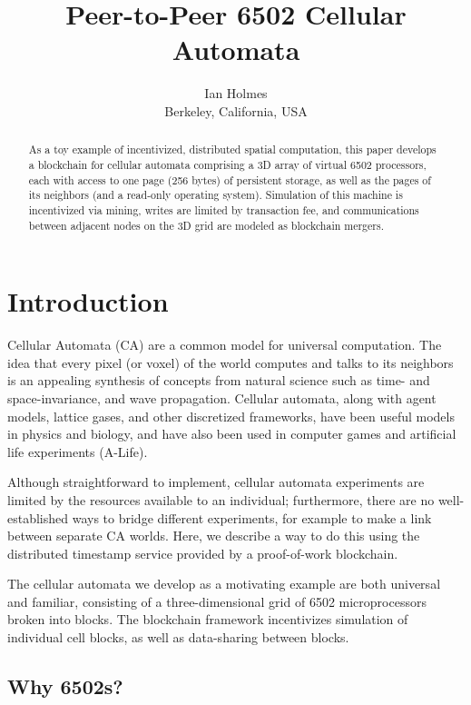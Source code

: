 \documentclass{article}
\begin{document}
\title{Peer-to-Peer 6502 Cellular Automata}
\author{Ian Holmes \\ Berkeley, California, USA}

\maketitle


\begin{abstract}
  As a toy example of incentivized, distributed spatial computation,
  this paper develops a blockchain for cellular automata
  comprising a 3D array of virtual 6502 processors, each with access to one page (256 bytes) of persistent storage,
  as well as the pages of its neighbors (and a read-only operating system).
  Simulation of this machine is incentivized via mining,
  writes are limited by transaction fee,
  and communications between adjacent nodes on the 3D grid are modeled as blockchain mergers.
\end{abstract}

\section{Introduction}

Cellular Automata (CA) are a common model for universal computation.
The idea that every pixel (or voxel) of the world computes and talks to its neighbors
is an appealing synthesis of concepts from natural science such as time- and space-invariance, and wave propagation.
Cellular automata, along with agent models, lattice gases, and other discretized frameworks, have been useful models in physics and biology,
and have also been used in computer games and artificial life experiments (A-Life).

Although straightforward to implement, cellular automata experiments are limited by the resources available to an individual;
furthermore, there are no well-established ways to bridge different experiments, for example to make a link between separate CA worlds.
Here, we describe a way to do this using the distributed timestamp service provided by a proof-of-work blockchain.

The cellular automata we develop as a motivating example are both universal and familiar, consisting of a three-dimensional grid of 6502 microprocessors broken into blocks.
The blockchain framework incentivizes simulation of individual cell blocks, as well as data-sharing between blocks.

\subsection{Why 6502s?}
\end{document}

